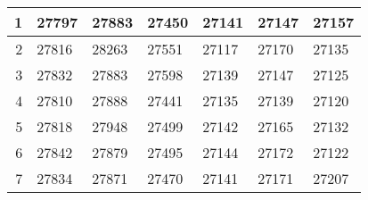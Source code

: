 \begin{table}[htb]
\begin{adjustbox}{width=\textwidth}
\begin{tabular}{|r|l|l|l|l|l|l|}
\hline
{\cellcolor[rgb]{0.953,0.953,0.953}}1                                                                                       & 27797                                   & 27883                                 & 27450                                   & 27141                                   & 27147                                 & 27157                                    \\ 
\hline
{\cellcolor[rgb]{0.953,0.953,0.953}}2                                                                                       & 27816                                   & 28263                                 & 27551                                   & 27117                                   & 27170                                 & 27135                                    \\ 
\hline
{\cellcolor[rgb]{0.953,0.953,0.953}}3                                                                                       & 27832                                   & 27883                                 & 27598                                   & 27139                                   & 27147                                 & 27125                                    \\ 
\hline
{\cellcolor[rgb]{0.953,0.953,0.953}}4                                                                                       & 27810                                   & 27888                                 & 27441                                   & 27135                                   & 27139                                 & 27120                                    \\ 
\hline
{\cellcolor[rgb]{0.953,0.953,0.953}}5                                                                                       & 27818                                   & 27948                                 & 27499                                   & 27142                                   & 27165                                 & 27132                                    \\ 
\hline
{\cellcolor[rgb]{0.953,0.953,0.953}}6                                                                                       & 27842                                   & 27879                                 & 27495                                   & 27144                                   & 27172                                 & 27122                                    \\ 
\hline
{\cellcolor[rgb]{0.953,0.953,0.953}}7                                                                                       & 27834                                   & 27871                                 & 27470                                   & 27141                                   & 27171                                 & 27207                                    \\ 

\end{tabular}
\end{adjustbox}
\end{table}
